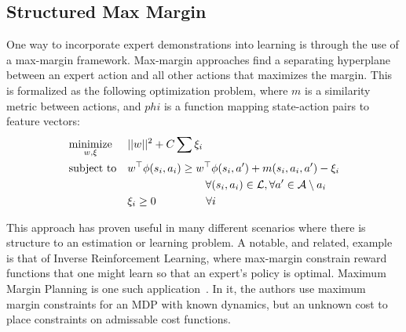 \subsection{Structured Max Margin}
One way to incorporate expert demonstrations into learning is through the use of a max-margin framework.
Max-margin approaches find a separating hyperplane between an expert action and all other actions that maximizes the margin.
This is formalized as the following optimization problem, where $m$ is a similarity metric between actions, and $phi$ is a function mapping state-action pairs to feature vectors:
\begin{equation}
\begin{aligned}
& \underset{w, \xi}{\text{minimize}}  & & ||w||^2 + C\sum \xi_i\\
& \text{subject to} & &w^\top \phi(s{}_i, a{}_i) \geq w^\top \phi(s{}_i, a{}') + m(s{}_i, a{}_i, a{}') - \xi_i 
\\&&&\hspace{2.5cm}\forall (s{}_i, a{}_i) \in \mathcal{L}{}, \forall a{}' \in \mathcal{A}{}\setminus a{}_i \\
& & &\xi_i \geq 0 \hspace{1.6cm} \forall i
\end{aligned}
\end{equation}

This approach has proven useful in many different scenarios where there is structure to an estimation or learning problem.
A notable, and related, example is that of Inverse Reinforcement Learning, where max-margin constrain reward functions that one might learn so that an expert's policy is optimal.
Maximum Margin Planning is one such application~\cite{Ratliff_ICML06}. 
In it, the authors use maximum margin constraints for an MDP with known dynamics, but an unknown cost to place constraints on admissable cost functions.


